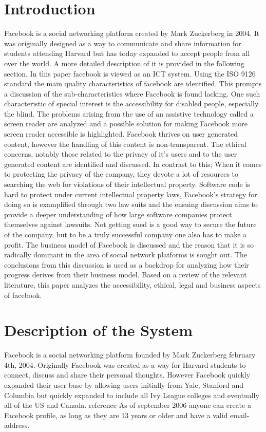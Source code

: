 \documentclass[conference]{IEEEtran}
\begin{document}
\section{Introduction}
Facebook is a social networking platform created by Mark Zuckerberg in 2004.
It was originally designed as a way to communicate and share information for
students attending Harvard but has today expanded to accept people from all
over the world. A more detailed description of it is provided in the following
section. In this paper facebook is viewed as an ICT system. Using the ISO 9126
standard the main quality characteristics of facebook are identified. This
prompts a discussion of the sub-characteristics where Facebook is found
lacking.  One such characteristic of special interest is the accessibility for
disabled people, especially the blind. The problems arising from the use of an
assistive technology called a screen reader are analyzed and a possible
solution for making Facebook more screen reader accessible is highlighted.
Facebook thrives on user generated content, however the handling of this
content is non-transparent. The ethical concerns, notably those related to the
privacy of it's users and to the user generated content are identified and
discussed. In contrast to this; When it comes to protecting the privacy of the
company, they devote a lot of resources to searching the web for violations of
their intellectual property.  Software code is hard to protect under current
intellectual property laws, Facebook's strategy for doing so is examplified
through two law suits and the ensuing discussion aims to provide a deeper
understanding of how large software companies protect themselves against
lawsuits. Not getting sued is a good way to secure the future of the company,
but to be a truly successful company one also has to make a profit. The
business model of Facebook is discussed and the reason that it is so radically
dominant in the area of social network platforms is sought out. The conclusions
from this discussion is used as a backdrop for analyzing how their progress
derives from their business model. Based on a review of the relevant
literature, this paper analyzes the accessibility, ethical, legal and business
aspects of facebook. 

\section{Description of the System}
\label{system}

Facebook is a social networking platform founded by Mark Zuckerberg february
4th, 2004. Originally Facebook was created as a way for Harvard students to
connect, discuss and share their personal thoughts. However Facebook quickly
expanded their user base by allowing users initially from Yale, Stanford and
Columbia but quickly expanded to include all Ivy League colleges and eventually
all of the US and Canada. reference As of september 2006 anyone can create a
Facebook profile, as long as they are 13 years or older and have a valid
email-address. 
\end{document}
